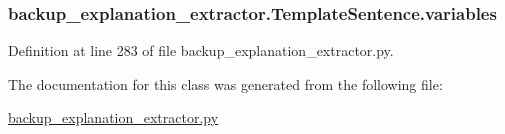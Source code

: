 \subsubsection[{variables}]{\setlength{\rightskip}{0pt plus 5cm}backup\+\_\+explanation\+\_\+extractor.\+Template\+Sentence.\+variables}\label{classbackup__explanation__extractor_1_1_template_sentence_a93b369f2650a022bc2340e927dab09af}


Definition at line 283 of file backup\+\_\+explanation\+\_\+extractor.\+py.



The documentation for this class was generated from the following file\+:\begin{DoxyCompactItemize}
\item 
\hyperlink{backup__explanation__extractor_8py}{backup\+\_\+explanation\+\_\+extractor.\+py}\end{DoxyCompactItemize}
